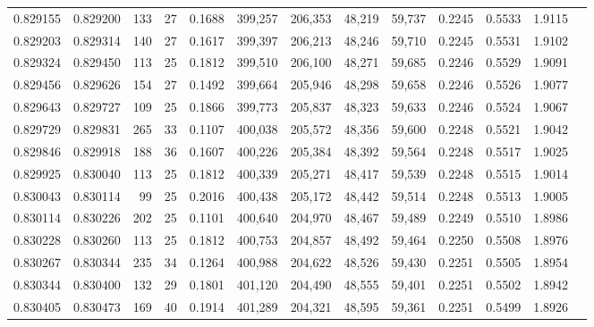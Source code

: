 \begin{tabular}{rrrrrrrrrrrrr}
0.829155 & 0.829200 &   133 &  27 &                                     0.1688 & 399,257 & 206,353 &  48,219 &  59,737 & 0.2245 & 0.5533 & 1.9115 \\
0.829203 & 0.829314 &   140 &  27 &                                     0.1617 & 399,397 & 206,213 &  48,246 &  59,710 & 0.2245 & 0.5531 & 1.9102 \\
0.829324 & 0.829450 &   113 &  25 &                                     0.1812 & 399,510 & 206,100 &  48,271 &  59,685 & 0.2246 & 0.5529 & 1.9091 \\
0.829456 & 0.829626 &   154 &  27 &                                     0.1492 & 399,664 & 205,946 &  48,298 &  59,658 & 0.2246 & 0.5526 & 1.9077 \\
0.829643 & 0.829727 &   109 &  25 &                                     0.1866 & 399,773 & 205,837 &  48,323 &  59,633 & 0.2246 & 0.5524 & 1.9067 \\
0.829729 & 0.829831 &   265 &  33 &                                     0.1107 & 400,038 & 205,572 &  48,356 &  59,600 & 0.2248 & 0.5521 & 1.9042 \\
0.829846 & 0.829918 &   188 &  36 &                                     0.1607 & 400,226 & 205,384 &  48,392 &  59,564 & 0.2248 & 0.5517 & 1.9025 \\
0.829925 & 0.830040 &   113 &  25 &                                     0.1812 & 400,339 & 205,271 &  48,417 &  59,539 & 0.2248 & 0.5515 & 1.9014 \\
0.830043 & 0.830114 &    99 &  25 &                                     0.2016 & 400,438 & 205,172 &  48,442 &  59,514 & 0.2248 & 0.5513 & 1.9005 \\
0.830114 & 0.830226 &   202 &  25 &                                     0.1101 & 400,640 & 204,970 &  48,467 &  59,489 & 0.2249 & 0.5510 & 1.8986 \\
0.830228 & 0.830260 &   113 &  25 &                                     0.1812 & 400,753 & 204,857 &  48,492 &  59,464 & 0.2250 & 0.5508 & 1.8976 \\
0.830267 & 0.830344 &   235 &  34 &                                     0.1264 & 400,988 & 204,622 &  48,526 &  59,430 & 0.2251 & 0.5505 & 1.8954 \\
0.830344 & 0.830400 &   132 &  29 &                                     0.1801 & 401,120 & 204,490 &  48,555 &  59,401 & 0.2251 & 0.5502 & 1.8942 \\
0.830405 & 0.830473 &   169 &  40 &                                     0.1914 & 401,289 & 204,321 &  48,595 &  59,361 & 0.2251 & 0.5499 & 1.8926 \\

\end{tabular}
